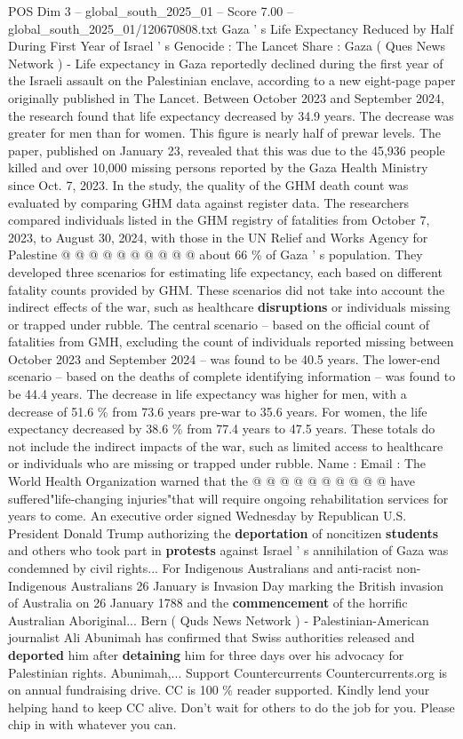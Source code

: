 \begin{textsample}{POS Dim 3 – global\_south\_2025\_01 – Score 7.00 – global\_south\_2025\_01/120670808.txt}  \label{ex:f3_pos_388}
Gaza ' s Life Expectancy Reduced by Half During First Year of Israel ' s Genocide : The Lancet Share : Gaza ( Ques News Network ) - Life expectancy in Gaza reportedly declined during the first year of the Israeli assault on the Palestinian enclave, according to a new eight-page paper originally published in The Lancet.
Between October 2023 and September 2024, the research found that life expectancy decreased by 34.9 years.
The decrease was greater for men than for women.
This figure is nearly half of prewar levels.
The paper, published on January 23, revealed that this was due to the 45,936 people killed and over 10,000 missing persons reported by the Gaza Health Ministry since Oct. 7, 2023.
In the study, the quality of the GHM death count was evaluated by comparing GHM data against register data.
The researchers compared individuals listed in the GHM registry of fatalities from October 7, 2023, to August 30, 2024, with those in the UN Relief and Works Agency for Palestine @ @ @ @ @ @ @ @ @ @ about 66 \% of Gaza ' s population.
They developed three scenarios for estimating life expectancy, each based on different fatality counts provided by GHM.
These scenarios did not take into account the indirect effects of the war, such as healthcare \textbf{disruptions} or individuals missing or trapped under rubble.
The central scenario -- based on the official count of fatalities from GMH, excluding the count of individuals reported missing between October 2023 and September 2024 -- was found to be 40.5 years.
The lower-end scenario -- based on the deaths of complete identifying information -- was found to be 44.4 years.
The decrease in life expectancy was higher for men, with a decrease of 51.6 \% from 73.6 years pre-war to 35.6 years.
For women, the life expectancy decreased by 38.6 \% from 77.4 years to 47.5 years.
These totals do not include the indirect impacts of the war, such as limited access to healthcare or individuals who are missing or trapped under rubble.
Name : Email : The World Health Organization warned that the @ @ @ @ @ @ @ @ @ @ have suffered"life-changing injuries"that will require ongoing rehabilitation services for years to come.
An executive order signed Wednesday by Republican U.S.
President Donald Trump authorizing the \textbf{deportation} of noncitizen \textbf{students} and others who took part in \textbf{protests} against Israel ' s annihilation of Gaza was condemned by civil rights...
For Indigenous Australians and anti-racist non-Indigenous Australians 26 January is Invasion Day marking the British invasion of Australia on 26 January 1788 and the \textbf{commencement} of the horrific Australian Aboriginal...
Bern ( Quds News Network ) - Palestinian-American journalist Ali Abunimah has confirmed that Swiss authorities released and \textbf{deported} him after \textbf{detaining} him for three days over his advocacy for Palestinian rights.
Abunimah,...
Support Countercurrents Countercurrents.org is on annual fundraising drive.
CC is 100 \% reader supported.
Kindly lend your helping hand to keep CC alive.
Don't wait for others to do the job for you.
Please chip in with whatever you can.


\end{textsample}
